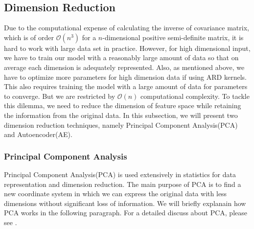 \documentclass[11pt,a4paper]{article}
\theoremstyle{definition}
\numberwithin{equation}{section}
\begin{document}
	
	\subsection{Dimension Reduction}
	Due to the computational expense of calculating the inverse of covariance matrix, which is of order $\mathcal O(n^3)$ for a $n$-dimensional positive semi-definite matrix, it is hard to work with large data set in practice. However, for high dimensional input, we have to train our model with a reasonably large amount of data so that on average each dimension is adequately represented. Also, as mentioned above, we have to optimize more parameters for high dimension data if using ARD kernels. This also requires training the model with a large amount of data for parameters to converge. But we are restricted by $\mathcal O(n)$ computational complexity. To tackle this dilemma, we need to reduce the dimension of feature space while retaining the information from the original data. In this subsection, we will present two dimension reduction techniques, namely Principal Component Analysis(PCA) and Autoencoder(AE). 
	
	\subsubsection{Principal Component Analysis}
	Principal Component Analysis(PCA) is used extensively in statistics for data representation and dimension reduction. The main purpose of PCA is to find a new coordinate system in which we can express the original data with less dimensions without significant loss of information. We will briefly explanain how PCA works in the following paragraph. For a detailed discuss about PCA, please see \cite[Jolliffe]{Jolliffe}.
	
\end{document}
